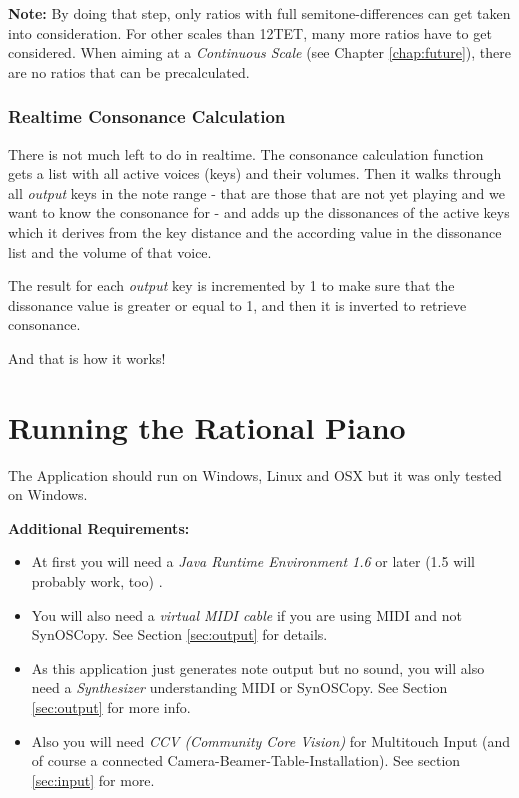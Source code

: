 \documentclass[12pt,a4paper,titlepage,oneside]{report}
\begin{document}
\textbf{Note:} By doing that step, only ratios with full semitone-differences can get taken into consideration. For other scales than 12TET, many more ratios have to get considered. When aiming at a \textit{Continuous Scale} (see Chapter \ref{chap:future}), there are no ratios that can be precalculated.


\subsection{Realtime Consonance Calculation}

There is not much left to do in realtime. The consonance calculation function gets a list with all active voices (keys) and their volumes. Then it walks through all \textit{output} keys in the note range - that are those that are not yet playing and we want to know the consonance for - and adds up the dissonances of the active keys which it derives from the key distance and the according value in the dissonance list and the volume of that voice.

The result for each \textit{output} key is incremented by 1 to make sure that the dissonance value is greater or equal to 1, and then it is inverted to retrieve consonance.

And that is how it works!

\chapter{Running the Rational Piano}
\label{chap:running}

The Application should run on Windows, Linux and OSX but it was only tested on Windows.

\noindent
\textbf{Additional Requirements:}
\begin{itemize}
\item At first you will need a \textit{\textit{Java Runtime Environment 1.6}} or later (1.5 will probably work, too) \cite{bib:java}.
\item You will also need a \textit{virtual MIDI cable} if you are using MIDI and not SynOSCopy. See Section \ref{sec:output} for details.
\item As this application just generates note output but no sound, you will also need a \textit{Synthesizer} understanding MIDI or SynOSCopy. See Section \ref{sec:output} for more info.
\item Also you will need \textit{CCV (Community Core Vision)} for Multitouch Input (and of course a connected Camera-Beamer-Table-Installation). See section \ref{sec:input} for more.
\end{itemize}
\end{document}
